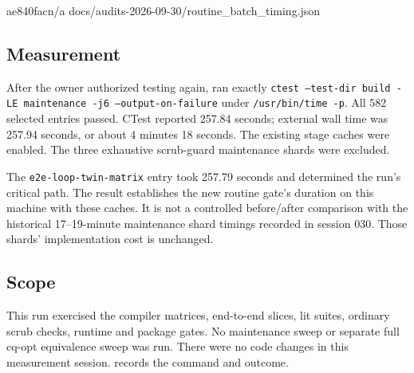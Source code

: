 %
  {ae840fac}{n/a}%
  {docs/audits-2026-09-30/routine\_batch\_timing.json}

\subsection*{Measurement}
After the owner authorized testing again, ran exactly
\texttt{ctest --test-dir build -LE maintenance -j6 --output-on-failure}
under \texttt{/usr/bin/time -p}. All 582 selected entries passed.
CTest reported 257.84 seconds; external wall time was 257.94 seconds,
or about 4 minutes 18 seconds. The existing stage caches were enabled.
The three exhaustive scrub-guard maintenance shards were excluded.

The \texttt{e2e-loop-twin-matrix} entry took 257.79 seconds and determined
the run's critical path. The result establishes the new routine gate's
duration on this machine with these caches. It is not a controlled
before/after comparison with the historical 17--19-minute maintenance
shard timings recorded in session 030. Those shards' implementation
cost is unchanged.

\subsection*{Scope}
This run exercised the compiler matrices, end-to-end slices, lit suites,
ordinary scrub checks, runtime and package gates. No maintenance sweep
or separate full cq-opt equivalence sweep was run. There were no code
changes in this measurement session. 
records the command and outcome.
